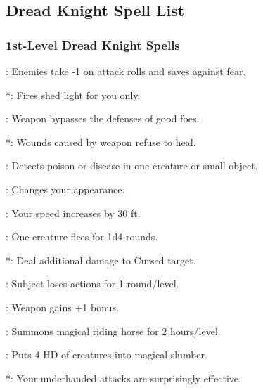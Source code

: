 \subsection{Dread Knight Spell List}
\subsubsection{1st-Level Dread Knight Spells}
\begin{list}{}{\leftmargin=1em}
\item {}: Enemies take -1 on attack rolls and saves against fear.
\item {}*: Fires shed light for you only.
\item {}: Weapon bypasses the defenses of good foes.
\item {}*: Wounds caused by weapon refuse to heal.
\item {}: Detects poison or disease in one creature or small object.
\item {}: Changes your appearance.
\item {}: Your speed increases by 30 ft.
\item {}: One creature flees for 1d4 rounds.
\item {}*: Deal additional damage to Cursed target.
\item {}: Subject loses actions for 1 round/level.
\item {}: Weapon gains +1 bonus.
\item {}: Summons magical riding horse for 2 hours/level.
\item {}: Puts 4 HD of creatures into magical slumber.
\item {}*: Your underhanded attacks are surprisingly effective.
\end{list}
